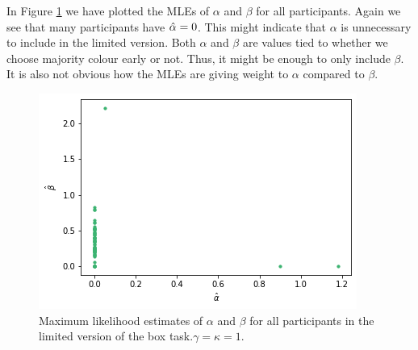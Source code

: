 In Figure \ref{fig:mles_limited_alpha_beta} we have plotted the MLEs of $\alpha$ and $\beta$ for all participants. Again we see that many participants have $\hat{\alpha}=0$. This might indicate that $\alpha$ is unnecessary to include in the limited version. Both $\alpha$ and $\beta$ are values tied to whether we choose majority colour early or not. Thus, it might be enough to only include $\beta$. It is also not obvious how the MLEs are giving weight to $\alpha$ compared to $\beta$. 
\begin{figure}
    \centering
    \includegraphics[scale=0.38]{pictures/plotted_mles_limited_alpha_beta_gk1.png}
    \caption[MLEs of $\alpha$ and $\beta$, limited. $\gamma=\kappa=1$]{Maximum likelihood estimates of $\alpha$ and $\beta$ for all participants in the limited version of the box task.$\gamma=\kappa=1$.}
    \label{fig:mles_limited_alpha_beta}
\end{figure}




